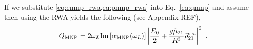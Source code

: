 If we substitute \eqref{eq:emnp_rwa,eq:pmnp_rwa} into Eq.~\eqref{eq:qmnp} and
assume then using the RWA yields the following (see Appendix REF),
%
%
\begin{equation}
    \qmnp = 2\omega_L \imag{\alphamnp(\omega_L)} \left|\frac{E_0}{2} +
    \frac{g\mut}{\epsb R^3}\rhoss \right|^2 \ .
    \label{eq:qmnp_ss}
\end{equation}
%
